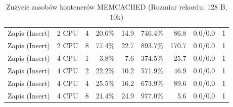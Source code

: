 \begin{table}[ht]
{\begin{tabular}{llcrrrrcc}
Zapis (Insert) & 2 CPU & 4 & 20.6\% & 14.9 & 746.4\% & 86.8 & 0.0/0.0 & 1 \\
Zapis (Insert) & 2 CPU & 8 & 77.4\% & 22.7 & 893.7\% & 170.7 & 0.0/0.0 & 1 \\
Zapis (Insert) & 4 CPU & 1 & 3.8\% & 7.6 & 374.5\% & 25.7 & 0.0/0.0 & 1 \\
Zapis (Insert) & 4 CPU & 2 & 22.2\% & 10.2 & 571.9\% & 46.9 & 0.0/0.0 & 1 \\
Zapis (Insert) & 4 CPU & 4 & 25.5\% & 16.2 & 673.9\% & 89.6 & 0.0/0.0 & 1 \\
Zapis (Insert) & 4 CPU & 8 & 24.4\% & 24.9 & 977.0\% & 5.6 & 0.0/0.0 & 1 \\
\bottomrule
\end{tabular}%
}
\caption{Zużycie zasobów kontenerów MEMCACHED (Rozmiar rekordu: 128 B, 10k)}
\label{tab:resources_memcached_small_10000}
\end{table}
